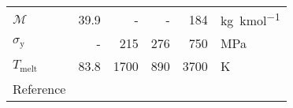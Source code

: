 \begin{refsection}
\begin{table}[h]
\begin{tabular}{@{}lrrrrl@{}}
            $\mathcal{M}$       & 39.9                                           & -                               & -                                                      & 184                                                                            & \unit{kg.kmol^{-1}}     \\
            $\sigma_\mathrm{y}$ & -                                               & 215                            & 276                                                   & 750                                                                            & \unit{MPa}              \\
            $T_\mathrm{melt}$   & 83.8                                           & 1700                           & 890                                                   & 3700                                                                           & \unit{K}                \\
            Reference           & \cite{lemmonThermophysicalPropertiesFluid2023} & \cite{matweb304StainlessSteel} & \cite{aerospacespecificationmetalsincASMMaterialData} & \cite{royalsocietyofchemistryTungstenElementInformation2023,   matwebTungsten} &                          \\
            \bottomrule
        \end{tabular}
    \end{table}
    \renewcommand{\bibfont}{\small}
    \printbibliography[
        heading=none,
        prenote=bibmark
    ]
\end{refsection}